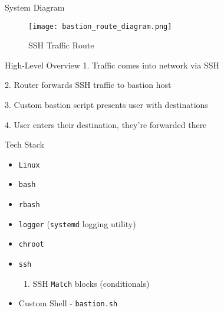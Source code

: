 \documentclass[14pt,compress,dvipsnames,aspectratio=169]{beamer} %
\begin{document}
\begin{frame}{System Diagram}
    \begin{figure}
        \centering
        \texttt{[image: bastion\_route\_diagram.png]}
        \caption{SSH Traffic Route}
    \end{figure}
\end{frame}





\begin{frame}{High-Level Overview}
        1. Traffic comes into network via SSH 
        \vspace{1.15cm}

        2. Router forwards SSH traffic to bastion host
        \vspace{1.15cm}

        3. Custom bastion script presents user with destinations
        \vspace{1.15cm}

        4. User enters their destination, they're forwarded there
\end{frame}


\begin{frame}{Tech Stack}
    \begin{itemize}
        \item{\texttt{Linux}}
        \item{\texttt{bash}}
        \item{\texttt{rbash}}
        \item{\texttt{logger} (\texttt{systemd} logging utility)}
        \item{\texttt{chroot}}
        \item{\texttt{ssh}}
            \begin{enumerate}
                \item{SSH \texttt{Match} blocks (conditionals)}
            \end{enumerate}
        \item{Custom Shell - \texttt{bastion.sh}}
    \end{itemize}
\end{frame}
\end{document}
